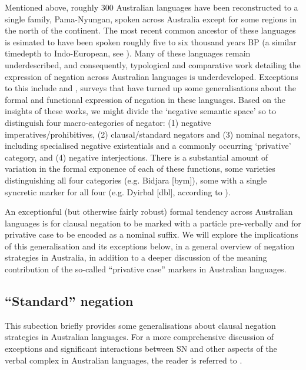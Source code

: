 Mentioned above, roughly 300 Australian languages have been reconstructed to a single family, Pama-Nyungan, spoken across Australia except for some regions in the north of the continent. The most recent common ancestor of these languages is esimated to have been spoken roughly five to six thousand years \textsc{BP} (a similar timedepth to Indo-European, see \citealt[742]{Bouckaert2018}). Many of these languages remain underdescribed, and consequently, typological and comparative work detailing the expression of negation across Australian languages is underdeveloped. Exceptions to this include \citealp{Dixon2002a} and \citealt{Phillips2021b}, surveys that have turned up some generalisations about the formal and functional expression of negation in these languages. Based on the insights of these works, we might divide the `negative semantic space' so to distinguish four macro-categories of negator: (1) negative imperatives/prohibitives, (2) clausal/standard negators and (3) nominal negators, including specialised negative existentials and a commonly occurring `privative' category, and (4) negative interjections. There is a substantial amount of variation in the formal exponence of each of these functions, some varieties distinguishing all four categories  (e.g. Bidjara [\gls{bym}]), some with a single syncretic marker for all four (e.g. Dyirbal [\gls{dbl}], according to \citealp[84--table 3.3]{Dixon2002a}). 

An exceptionful (but otherwise fairly robust) formal tendency across Australian languages is for clausal negation to be marked with a particle pre-verbally and for privative case to be encoded as a nominal suffix. We will explore the implications of this generalisation and its exceptions below, in a general overview of negation strategies in Australia, in addition to a deeper discussion of the meaning contribution of the so-called ``privative case'' markers in Australian languages. %
\subsection{``Standard'' negation}
This subection briefly provides some generalisations about clausal negation strategies in Australian languages. For a more comprehensive discussion of exceptions and significant interactions between SN and other aspects of the verbal complex in Australian languages, the reader is referred to \citealt{Phillips2021b}.

